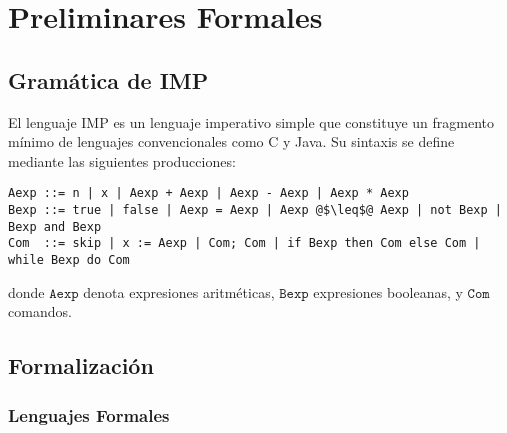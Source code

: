 \documentclass[10pt]{book}
\begin{document}
\section{Preliminares Formales}

\subsection{Gramática de IMP}

El lenguaje IMP es un lenguaje imperativo simple que constituye un fragmento mínimo de lenguajes convencionales como C y Java. Su sintaxis se define mediante las siguientes producciones:

\begin{lstlisting}[style=BNFStyle]
Aexp ::= n | x | Aexp + Aexp | Aexp - Aexp | Aexp * Aexp
Bexp ::= true | false | Aexp = Aexp | Aexp @$\leq$@ Aexp | not Bexp | Bexp and Bexp
Com  ::= skip | x := Aexp | Com; Com | if Bexp then Com else Com | while Bexp do Com
\end{lstlisting}

donde $\texttt{Aexp}$ denota expresiones aritméticas, $\texttt{Bexp}$ expresiones booleanas, y $\texttt{Com}$ comandos.

\subsection{Formalización}

\subsubsection{Lenguajes Formales}
\end{document}
